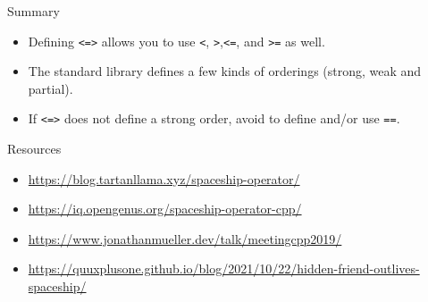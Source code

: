 \begin{frame}[fragile]
  \begin{alertblock}{Summary}
    \begin{itemize}
      \item Defining \texttt{<=>} allows you to use \texttt{<}, \texttt{>},\texttt{<=}, and \texttt{>=} as well.
      \item The standard library defines a few kinds of orderings (strong, weak and partial).
      \item If \texttt{<=>} does not define a strong order, avoid to define and/or use \texttt{==}.
    \end{itemize}
  \end{alertblock}
  \begin{block}{Resources}
    \begin{itemize}
      \item \url{https://blog.tartanllama.xyz/spaceship-operator/}
      \item \url{https://iq.opengenus.org/spaceship-operator-cpp/}
      \item \url{https://www.jonathanmueller.dev/talk/meetingcpp2019/}
      \item \url{https://quuxplusone.github.io/blog/2021/10/22/hidden-friend-outlives-spaceship/}
    \end{itemize}
  \end{block}
\end{frame}
